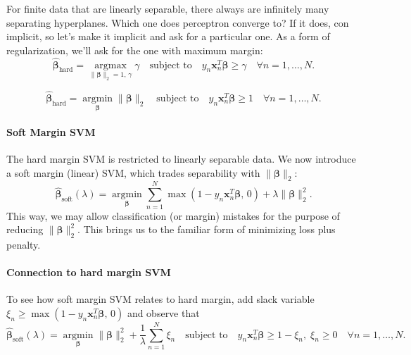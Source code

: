 For finite data that are linearly separable, there always are infinitely many separating hyperplanes. Which one does perceptron converge to? If it does, con implicit, so let's make it implicit and ask for a particular one. As a form of regularization, we'll ask for the one with maximum margin:
\begin{equation*}
\hat{\mathbf{\beta}}_{\text{hard}} = \operatorname*{argmax}_{\|\mathbf{\beta}\|_2 = 1,\, \gamma} \gamma \quad \text{subject to} \quad y_n \mathbf{x}_n^{T} \mathbf{\beta} \geq \gamma \quad \forall n = 1, \ldots, N.
\end{equation*}
\begin{prop}
\begin{equation*}
\hat{\mathbf{\beta}}_{\text{hard}} = \operatorname*{argmin}_{\mathbf{\beta}} \|\mathbf{\beta}\|_2 \quad \text{subject to} \quad y_n \mathbf{x}_n^{T} \mathbf{\beta} \geq 1 \quad \forall n = 1, \ldots, N.
\end{equation*}
\end{prop}

\paragraph{Soft Margin SVM}
The hard margin SVM is restricted to linearly separable data. We now introduce a soft margin (linear) SVM, which trades separability with $\|\mathbf{\beta}\|_2$:
\begin{equation*}
\hat{\mathbf{\beta}}_{\text{soft}}(\lambda) = \operatorname*{argmin}_{\mathbf{\beta}} \sum_{n=1}^{N} \max(1 - y_n \mathbf{x}_n^{T} \mathbf{\beta},\, 0) + \lambda \|\mathbf{\beta}\|_2^2.
\end{equation*}
This way, we may allow classification (or margin) mistakes for the purpose of reducing $\|\mathbf{\beta}\|_2^2$. This brings us to the familiar form of minimizing loss plus penalty.

\paragraph{Connection to hard margin SVM}
To see how soft margin SVM relates to hard margin, add slack variable $\xi_n \geq \max(1 - y_n \mathbf{x}_n^{T} \mathbf{\beta},\, 0)$ and observe that
\begin{equation*}
\hat{\mathbf{\beta}}_{\text{soft}}(\lambda) = \operatorname*{argmin}_{\mathbf{\beta}} \|\mathbf{\beta}\|_2^2 + \frac{1}{\lambda} \sum_{n=1}^{N} \xi_n \quad \text{subject to} \quad y_n \mathbf{x}_n^{T} \mathbf{\beta} \geq 1 - \xi_n,\; \xi_n \geq 0 \quad \forall n = 1, \ldots, N.
\end{equation*}

